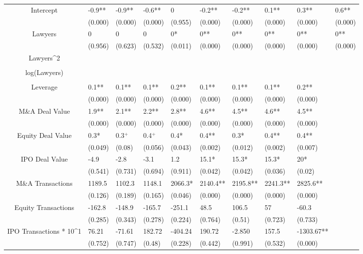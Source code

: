 \documentclass{article}
\begin{document}
\begin{table}[H]
\begin{tabular}{|clllllllll|}
Intercept & -0.9** & -0.9** & -0.6** & 0 & -0.2** & -0.2** & 0.1** & 0.3** & 0.6** \\
   & (0.000) & (0.000) & (0.000) & (0.955) & (0.000) & (0.000) & (0.000) & (0.000) & (0.000) \\
  Lawyers & 0 & 0 & 0 & 0* & 0** & 0** & 0** & 0** & 0** \\
   & (0.956) & (0.623) & (0.532) & (0.011) & (0.000) & (0.000) & (0.000) & (0.000) & (0.000) \\
  Lawyers^2 &  &  &  &  &  &  &  &  &  \\
   &  &  &  &  &  &  &  &  &  \\
  log(Lawyers) &  &  &  &  &  &  &  &  &  \\
   &  &  &  &  &  &  &  &  &  \\
  Leverage & 0.1** & 0.1** & 0.1** & 0.2** & 0.1** & 0.1** & 0.1** & 0.2** &  \\
   & (0.000) & (0.000) & (0.000) & (0.000) & (0.000) & (0.000) & (0.000) & (0.000) &  \\
  M\&A Deal Value & 1.9** & 2.1** & 2.2** & 2.8** & 4.6** & 4.5** & 4.6** & 4.5** &  \\
   & (0.000) & (0.000) & (0.000) & (0.000) & (0.000) & (0.000) & (0.000) & (0.000) &  \\
  Equity Deal Value & 0.3* & 0.3$^{+}$ & 0.4$^{+}$ & 0.4* & 0.4** & 0.3* & 0.4** & 0.4** &  \\
   & (0.049) & (0.08) & (0.056) & (0.043) & (0.002) & (0.012) & (0.002) & (0.007) &  \\
  IPO Deal Value & -4.9 & -2.8 & -3.1 & 1.2 & 15.1* & 15.3* & 15.3* & 20* &  \\
   & (0.541) & (0.731) & (0.694) & (0.911) & (0.042) & (0.042) & (0.036) & (0.02) &  \\
  M\&A Transactions & 1189.5 & 1102.3 & 1148.1 & 2066.3* & 2140.4** & 2195.8** & 2241.3** & 2825.6** &  \\
   & (0.126) & (0.189) & (0.165) & (0.046) & (0.000) & (0.000) & (0.000) & (0.000) &  \\
  Equity Transactions & -162.8 & -148.9 & -165.7 & -251.1 & 48.5 & 106.5 & 57 & -60.3 &  \\
   & (0.285) & (0.343) & (0.278) & (0.224) & (0.764) & (0.51) & (0.723) & (0.733) &  \\
  IPO Transactions * 10^1 & 76.21 & -71.61 & 182.72 & -404.24 & 190.72 & -2.850 & 157.5 & -1303.67** &  \\
   & (0.752) & (0.747) & (0.48) & (0.228) & (0.442) & (0.991) & (0.532) & (0.000) &  \\

\end{tabular}
\end{table}
\end{document}
